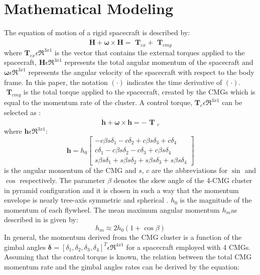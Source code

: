 \documentclass[journal]{new-aiaa}
\begin{document}
\section{Mathematical Modeling}
The equation of motion of a rigid spacecraft is described by:
\begin{equation}
\dot { \textbf{H} } +\boldsymbol{\omega}\times \textbf{H}=\textbf{ T}_{ex}+\textbf{ T}_{cmg}
\label{eq:dyn_eq}
\end{equation}
where $\textbf{T}_{ex} \epsilon { \Re  }^{ 3x1}$ is the vector that contains the external torques applied to the spacecraft, $ \textbf{H} \epsilon {\Re}^{3x1}$ represents the total angular momentum of the spacecraft and $\boldsymbol{\omega} \epsilon {\Re}^{3x1}$ represents the angular velocity of the spacecraft with respect to the body frame. In this paper, the notation $ \dot{\boldsymbol{(\cdot)}}$ indicates the time derivative of $\boldsymbol{(\cdot)}$. $\textbf{ T}_{cmg}$ is the total torque applied to the spacecraft, created by the CMGs which is equal to the momentum rate of the cluster. A control torque, $\textbf{T}_c  \epsilon {\Re}^{3x1}$ can be selected as \cite{lappasthesis}:
\begin{equation}
\dot { \textbf{h} } +\boldsymbol{\omega}\times \textbf{h}=-\textbf{ T }_c
\end{equation}
where $ \textbf{h}\epsilon\Re^{3x1}$:
\begin{equation}
\textbf{h}=h_0
\begin{bmatrix}
-c\beta s\delta_1-c\delta_2+c\beta s\delta_3+c\delta_4 \\
c\delta_1 -c\beta s\delta_2 -c\delta_3 +c\beta s\delta_4 \\
s\beta s\delta_1+s\beta s\delta_2+s\beta s\delta_3+s\beta s\delta_4
\end{bmatrix}  
\end{equation}
is the angular momentum of the CMG and $s$, $c$ are the abbreviations for $\sin$ and $\cos$ respectively.  The parameter $\beta$ denotes the skew angle of the 4-CMG cluster in pyramid configuration and it is chosen in such a way that the momentum envelope is nearly tree-axis symmetric and spherical \cite{SMCS}. $h_0$ is the magnitude of the momentum of each flywheel.
The mean maximum angular momentum $h_m$as described in \cite{omagari2006} is given by: 
\begin{equation}
h_m\approx2h_0(1+\cos\beta)
\end{equation}
In general, the momentum derived from the CMG cluster is a function of the gimbal angles $\boldsymbol{\delta}=[\delta_1, \delta_2, \delta_3, \delta_4]^T\epsilon\Re^{4x1}$ for a spacecraft employed with 4 CMGs. Assuming that the control torque is known, the relation between the total CMG momentum rate and the gimbal angles rates  can be derived by the equation:
\end{document}
